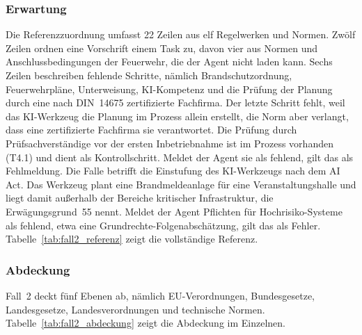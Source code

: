 \subsubsection{Erwartung}\label{sec:fall2_erwartung}
Die Referenzzuordnung umfasst 22 Zeilen aus elf Regelwerken und Normen.
Zwölf Zeilen ordnen eine Vorschrift einem Task zu, davon vier aus Normen und Anschlussbedingungen der Feuerwehr, die der Agent nicht laden kann.
Sechs Zeilen beschreiben fehlende Schritte, nämlich Brandschutzordnung, Feuerwehrpläne, Unterweisung, KI-Kompetenz und die Prüfung der Planung durch eine nach DIN~14675 zertifizierte Fachfirma.
Der letzte Schritt fehlt, weil das KI-Werkzeug die Planung im Prozess allein erstellt, die Norm aber verlangt, dass eine zertifizierte Fachfirma sie verantwortet.
Die Prüfung durch Prüfsachverständige vor der ersten Inbetriebnahme ist im Prozess vorhanden (T4.1) und dient als Kontrollschritt.
Meldet der Agent sie als fehlend, gilt das als Fehlmeldung.
Die Falle betrifft die Einstufung des KI-Werkzeugs nach dem AI Act.
Das Werkzeug plant eine Brandmeldeanlage für eine Veranstaltungshalle und liegt damit außerhalb der Bereiche kritischer Infrastruktur, die Erwägungsgrund~55 nennt.
Meldet der Agent Pflichten für Hochrisiko-Systeme als fehlend, etwa eine Grundrechte-Folgenabschätzung, gilt das als Fehler.
Tabelle~\ref{tab:fall2_referenz} zeigt die vollständige Referenz.

\subsubsection{Abdeckung}\label{sec:fall2_abdeckung}
Fall~2 deckt fünf Ebenen ab, nämlich EU-Verordnungen, Bundesgesetze, Landesgesetze, Landesverordnungen und technische Normen.
Tabelle~\ref{tab:fall2_abdeckung} zeigt die Abdeckung im Einzelnen.

